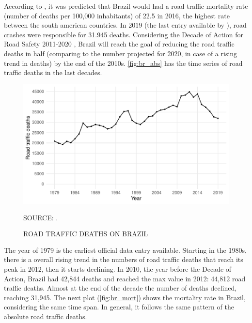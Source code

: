 

 According to \textcite{WHO2018}, it was predicted that Brazil would had a road traffic mortality rate (number of deaths per 100,000 inhabitants) of 22.5 in 2016, the highest rate between the south american countries. In 2019 (the last entry available by \textcite{MinistryofHealth2020}), road crashes were responsible for 31.945 deaths. Considering the Decade of Action for Road Safety 2011-2020 \cite{WHO2011}, Brazil will reach the goal of reducing the road traffic deaths in half (comparing to the number projected for 2020, in case of a rising trend in deaths) by the end of the 2010s. \autoref{fig:br_abs} has the time series of road traffic deaths in the last decades.  


\begin{figure}[!htbp]
    \centering\footnotesize
    \captionsetup{font=footnotesize}
    \caption{ROAD TRAFFIC DEATHS ON BRAZIL}
    \includegraphics{fig/brazil_abs.pdf}
    \label{fig:br_abs}
    \par SOURCE: \textcite{MinistryofHealth2020}.
\end{figure}


The year of 1979 is the earliest official data entry available. Starting in the 1980s, there is a overall rising trend in the numbers of road traffic deaths that reach its peak in 2012, then it starts declining. In 2010, the year before the Decade of Action, Brazil had 42,844 deaths and reached the max value in 2012: 44,812 road traffic deaths. Almost at the end of the decade the number of deaths declined, reaching 31,945. The next plot (\autoref{fig:br_mort}) shows the mortality rate in Brazil, considering the same time span. In general, it follows the same pattern of the absolute road traffic deaths.

